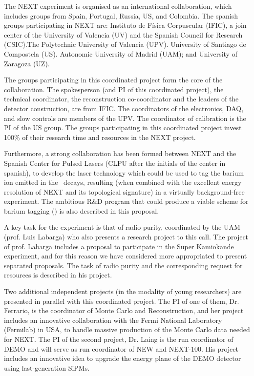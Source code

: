 The NEXT experiment is organised as an international collaboration, which includes groups from Spain, Portugal, Russia, US, and Colombia. The spanish groups participating in NEXT are: Instituto de Física Corpuscular (IFIC), a join center of the University of Valencia (UV) and the Spanish Council for Research (CSIC).The  Polytechnic University of Valencia (UPV). University of Santiago de Compostela (US). Autonomic University of Madrid (UAM); and University of Zaragoza (UZ). 

The groups participating in this coordinated project form the core of the collaboration. The spokesperson (and PI of this coordinated project), the technical coordinator, the reconstruction co-coordinator and the leaders of the detector construction, are from IFIC. The coordinators of the electronics, DAQ, and slow controls are members of the UPV. The coordinator of calibration is the PI  of the US group. The groups participating in this coordinated project invest 100\% of their research time and resources in the NEXT project. 

Furthermore, a strong collaboration has been  formed between NEXT and the Spanish Center for Pulsed Lasers (CLPU after the initials of the center in spanish), to develop the laser technology which could be used to tag the barium ion emitted in the \bb\ decays, resulting (when combined with the excellent energy resolution of NEXT and its topological signature) in a virtually background-free experiment. The ambitious R\&D program that could produce a viable scheme for barium tagging (\BATA) is also described in this proposal.  

A key task for the experiment is that of radio purity, coordinated by the UAM (prof. Luis Labarga) who also presents a research project to this call. The project of prof. Labarga includes a proposal to participate in the Super Kamiokande experiment, and for this reason we have considered more appropriated to present separated proposals. The task of radio purity and the corresponding request for resources is described in his project.

Two additional independent projects (in the modality of young researchers) are presented in parallel with this coordinated project. The PI of one of them, Dr. Ferrario, is the coordinator of Monte Carlo and Reconstruction, and her project includes an innovative collaboration with the Fermi National Laboratory (Fermilab) in USA, to handle massive production of the Monte Carlo data needed for NEXT. The PI of the second project, Dr. Laing is the run coordinator of DEMO and will serve as run coordinator of NEW and NEXT-100. His project includes an innovative idea to upgrade the energy plane of the DEMO detector using last-generation SiPMs.


